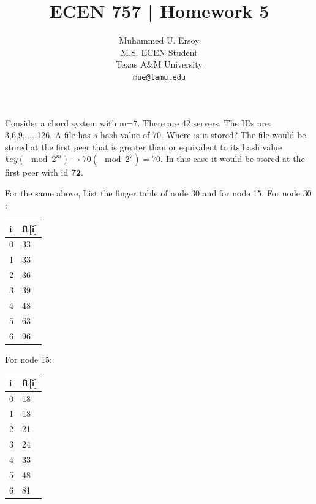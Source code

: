 \documentclass{article}
\title{ECEN 757 | Homework 5}
\author{%
  Muhammed U. Ersoy\\
  M.S. ECEN Student\\
  Texas A\&M University\\
  \texttt{mue@tamu.edu} \\
 }
\begin{document}
\maketitle

\begin{tcolorbox}[colback=blue!5!white,colframe=blue!75!black,title=Question 1]
    Consider a chord system with m=7. There are 42 servers. The IDs are: 3,6,9,....,126. A file has a
        hash value of 70. Where is it stored?
    \tcblower
    The file would be stored at the first peer that is greater than or equivalent to its hash value $key (\mod 2^m) \rightarrow 70 (\mod 2^7) = 70$.
    In this case it would be stored at the first peer with id $\textbf{72}$.
\end{tcolorbox}
\begin{tcolorbox}[colback=blue!5!white,colframe=blue!75!black,title=Question 2]
    For the same above, List the finger table of node 30 and for node 15.
    \tcblower
    For node $30$:
    \begin{table}[H]
    \begin{tabular}{ll}
    i & ft{[}i{]} \\ \hline
    0 & 33        \\
    1 & 33        \\
    2 & 36        \\
    3 & 39        \\
    4 & 48        \\
    5 & 63        \\
    6 & 96       
    \end{tabular}
    \end{table}

    For node $15$:
    \begin{table}[H]
    \begin{tabular}{ll}
    i & ft{[}i{]} \\ \hline
    0 & 18        \\
    1 & 18        \\
    2 & 21        \\
    3 & 24        \\
    4 & 33        \\
    5 & 48        \\
    6 & 81       
    \end{tabular}
    \end{table}
\end{tcolorbox}
\end{document}
